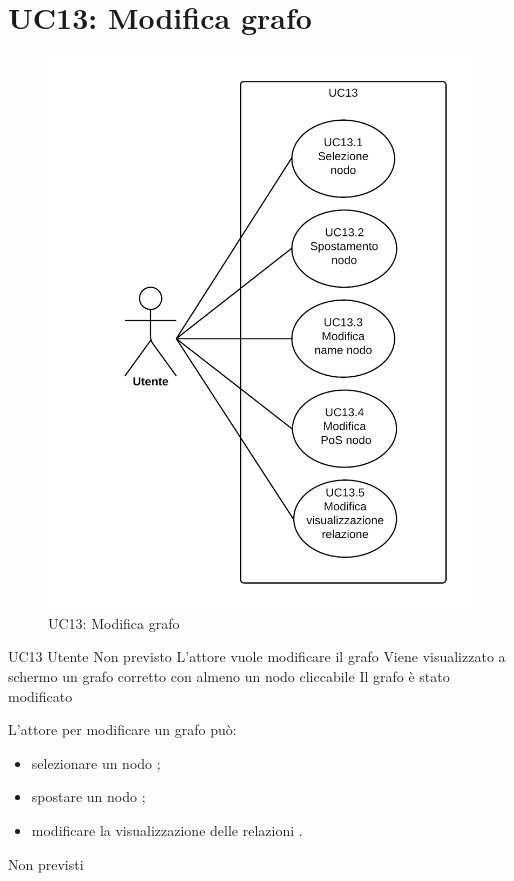 \documentclass[../AnalisideiRequisiti.tex]{subfiles}
\begin{document}
\section{UC13: Modifica grafo}
\begin{figure}[H]
	\centering
	\includegraphics[width=\textwidth]{../img/UC13.png}
	\caption{UC13: Modifica grafo}
\end{figure}
\UserCase
{UC13}
{Utente}
{Non previsto}
{L'attore vuole modificare il grafo}
{Viene visualizzato a schermo un grafo corretto con almeno un nodo cliccabile }
{Il grafo è stato modificato}
{
	L'attore per modificare un grafo può:
	\begin{itemize}
		\item{} selezionare un nodo ;
		\item{} spostare un nodo ;	
		\item{} modificare la visualizzazione delle relazioni .		
	\end{itemize}
}
{Non previsti}
\end{document}
